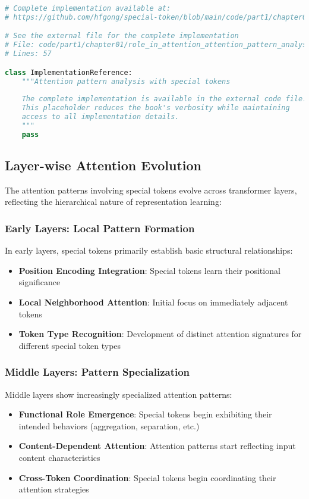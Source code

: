 \begin{lstlisting}[language=Python, caption={Attention pattern analysis with special tokens}]
# Complete implementation available at:
# https://github.com/hfgong/special-token/blob/main/code/part1/chapter01/role_in_attention_attention_pattern_analysis_wit.py

# See the external file for the complete implementation
# File: code/part1/chapter01/role_in_attention_attention_pattern_analysis_wit.py
# Lines: 57

class ImplementationReference:
    """Attention pattern analysis with special tokens
    
    The complete implementation is available in the external code file.
    This placeholder reduces the book's verbosity while maintaining
    access to all implementation details.
    """
    pass
\end{lstlisting}

\subsection{Layer-wise Attention Evolution}

The attention patterns involving special tokens evolve across transformer layers, reflecting the hierarchical nature of representation learning:

\subsubsection{Early Layers: Local Pattern Formation}

In early layers, special tokens primarily establish basic structural relationships:
\begin{itemize}
\item \textbf{Position Encoding Integration}: Special tokens learn their positional significance
\item \textbf{Local Neighborhood Attention}: Initial focus on immediately adjacent tokens
\item \textbf{Token Type Recognition}: Development of distinct attention signatures for different special token types
\end{itemize}

\subsubsection{Middle Layers: Pattern Specialization}

Middle layers show increasingly specialized attention patterns:
\begin{itemize}
\item \textbf{Functional Role Emergence}: Special tokens begin exhibiting their intended behaviors (aggregation, separation, etc.)
\item \textbf{Content-Dependent Attention}: Attention patterns start reflecting input content characteristics
\item \textbf{Cross-Token Coordination}: Special tokens begin coordinating their attention strategies
\end{itemize}

